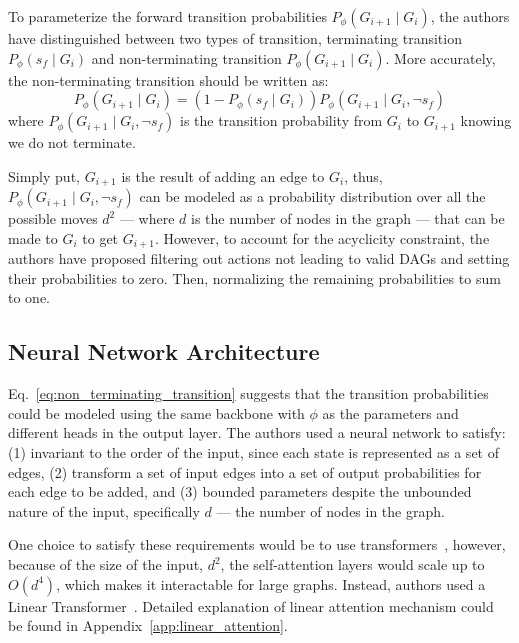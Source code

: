 \documentclass{lxaiproposal}
\begin{document}
    To parameterize the forward transition probabilities $P_{\phi}(G_{i+1} \mid G_i)$, the authors have distinguished
    between two types of transition, terminating transition $P_{\phi}(s_f \mid G_i)$ and non-terminating transition
    $P_{\phi}(G_{i+1} \mid G_i)$.
    More accurately, the non-terminating transition should be written as:
    \begin{equation}
        P_{\phi}(G_{i+1} \mid G_i) = (1-P_{\phi}(s_f \mid G_i)) P_{\phi}(G_{i+1} \mid G_i, \neg s_f)
        \label{eq:non_terminating_transition}
    \end{equation}
    where $P_{\phi}(G_{i+1} \mid G_i, \neg s_f)$ is the transition probability from $G_i$ to $G_{i+1}$ knowing we do not
    terminate.

    Simply put, $G_{i+1}$ is the result of adding an edge to $G_i$, thus, $P_{\phi}(G_{i+1} \mid G_i, \neg s_f)$ can
    be modeled
    as a probability distribution over all the possible moves $d^2$ --- where $d$ is the number of nodes in the graph ---
    that can be made to $G_i$ to get $G_{i+1}$. However, to account for the acyclicity constraint, the authors have
    proposed filtering out actions not leading to valid DAGs and setting their probabilities to zero. Then, normalizing
    the remaining probabilities to sum to one.

    \subsection{Neural Network Architecture}\label{sec:nn_architecture}
    \vspace*{-3mm}

    Eq.~\eqref{eq:non_terminating_transition} suggests that the transition probabilities could be modeled using the
    same backbone with $\phi$ as the parameters and different heads in the output layer. The authors used a neural
    network to satisfy: (1) invariant to the order of the input, since each state is represented as a set of edges,
    (2) transform a set of input edges into a set of output probabilities for each edge to be added, and (3) bounded
    parameters despite the unbounded nature of the input, specifically $d$ --- the number of nodes in the graph.

    One choice to satisfy these requirements would be to use transformers~\cite{vaswani2023attentionneed}, however,
    because of the size of the input, $d^2$, the self-attention layers would scale up to $O(d^4)$, which makes it
    interactable for large graphs. Instead, authors used a Linear Transformer~\cite{katharopoulos2020transformersrnnsfastautoregressive}.
    Detailed explanation of linear attention mechanism could be found in Appendix~\ref{app:linear_attention}.
\end{document}
